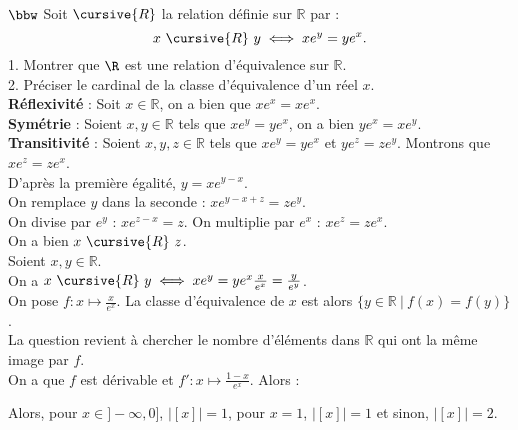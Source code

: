 \documentclass[11pt]{article}
\renewcommand*{\r}{\cursive{R}}
\begin{document}
\begin{exercice}{$\bbw$}{}
    Soit $\r$ la relation définie sur $\mathbb{R}$ par :
    \begin{equation*}
        x ~\r ~ y \iff xe^y = ye^x.
    \end{equation*}
    1. Montrer que $\R$ est une relation d'équivalence sur $\mathbb{R}$.\\
    2. Préciser le cardinal de la classe d'équivalence d'un réel $x$.
    \tcblower
    \\
    \textbf{Réflexivité} : Soit $x\in\mathbb{R}$, on a bien que $xe^x = xe^x$.\\
    \textbf{Symétrie} : Soient $x,y\in\mathbb{R}$ tels que $xe^y = ye^x$, on a bien $ye^x = xe^y$.\\
    \textbf{Transitivité} : Soient $x,y,z\in\mathbb{R}$ tels que $xe^y = ye^x$ et $ye^z = ze^y$. Montrons que $xe^z = ze^x$.\\
    D'après la première égalité, $y=xe^{y-x}$.\\
    On remplace $y$ dans la seconde : $xe^{y-x+z}=ze^y$.\\
    On divise par $e^y$ : $xe^{z-x}=z$. On multiplie par $e^x$ : $xe^z = ze^x$.\\
    On a bien $x ~ \r ~ z$.\\[0.2cm]
     Soient $x,y\in\mathbb{R}$.\\
    On a $x ~ \r ~ y \iff xe^y = ye^x \frac{x}{e^x} = \frac{y}{e^y}$.\\
    On pose $f:x\mapsto \frac{x}{e^x}$. La classe d'équivalence de $x$ est alors $\{y\in\mathbb{R} ~ | ~ f(x) = f(y)\}$.\\
    La question revient à chercher le nombre d'éléments dans $\mathbb{R}$ qui ont la même image par $f$.\\
    On a que $f$ est dérivable et $f':x\mapsto \frac{1-x}{e^{x}}$. Alors :
    \begin{center}
    \end{center}
    Alors, pour $x\in]-\infty,0]$, $|[x]|=1$, pour $x=1$, $|[x]|=1$ et sinon, $|[x]|=2$.
\end{exercice}
\end{document}

